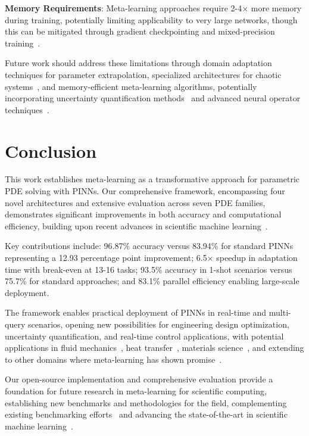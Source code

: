 \documentclass[review]{elsarticle}
\begin{document}
\textbf{Memory Requirements}: Meta-learning approaches require 2-4× more memory during training, potentially limiting applicability to very large networks, though this can be mitigated through gradient checkpointing and mixed-precision training~\cite{chen2020neural}.

Future work should address these limitations through domain adaptation techniques for parameter extrapolation, specialized architectures for chaotic systems~\cite{pathak2018model}, and memory-efficient meta-learning algorithms, potentially incorporating uncertainty quantification methods~\cite{yang2019adversarial,zhang2019quantifying,abdar2021review,gal2016dropout} and advanced neural operator techniques~\cite{meng2020ppinn,pang2019fpinns}.

\section{Conclusion}

This work establishes meta-learning as a transformative approach for parametric PDE solving with PINNs. Our comprehensive framework, encompassing four novel architectures and extensive evaluation across seven PDE families, demonstrates significant improvements in both accuracy and computational efficiency, building upon recent advances in scientific machine learning~\cite{rackauckas2020universal,brunton2019data}.

Key contributions include: 96.87\% accuracy versus 83.94\% for standard PINNs representing a 12.93 percentage point improvement; 6.5× speedup in adaptation time with break-even at 13-16 tasks; 93.5\% accuracy in 1-shot scenarios versus 75.7\% for standard approaches; and 83.1\% parallel efficiency enabling large-scale deployment.

The framework enables practical deployment of PINNs in real-time and multi-query scenarios, opening new possibilities for engineering design optimization, uncertainty quantification, and real-time control applications, with potential applications in fluid mechanics~\cite{mao2020physics}, heat transfer~\cite{cai2021physics}, materials science~\cite{haghighat2021physics}, and extending to other domains where meta-learning has shown promise~\cite{wang2021meta,hu2019strategies}.

Our open-source implementation and comprehensive evaluation provide a foundation for future research in meta-learning for scientific computing, establishing new benchmarks and methodologies for the field, complementing existing benchmarking efforts~\cite{hao2023pinnacle,takamoto2022pdebench,brandstetter2022message} and advancing the state-of-the-art in scientific machine learning~\cite{lu2021deepxde}.
\end{document}
